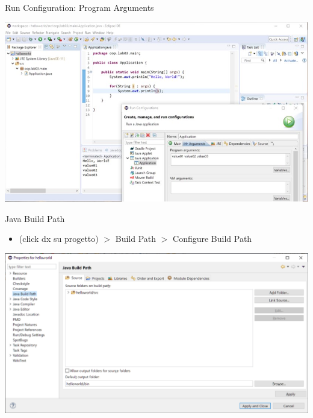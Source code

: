 \documentclass[presentation]{beamer}
\begin{document}
\begin{frame}{Run Configuration: Program Arguments}
\begin{center}
\includegraphics[width=\textwidth]{img/eclipse-screenshots/eclipse-ide-04e.jpg}
\end{center}
\end{frame}

\begin{frame}{Java Build Path}
\begin{itemize}
\item (click dx su progetto) $>$ Build Path $>$ Configure Build Path
\end{itemize}
\begin{center}
\includegraphics[width=\textwidth]{img/eclipse-screenshots/eclipse-ide-05a.png}
\end{center}
\end{frame}
\end{document}
